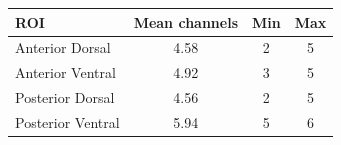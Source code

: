 \begin{tabular}{lccc}
\toprule
ROI & Mean channels & Min & Max\\
\midrule
Anterior Dorsal & 4.58 & 2 & 5\\
Anterior Ventral & 4.92 & 3 & 5\\
Posterior Dorsal & 4.56 & 2 & 5\\
Posterior Ventral & 5.94 & 5 & 6\\
\bottomrule
\end{tabular}
